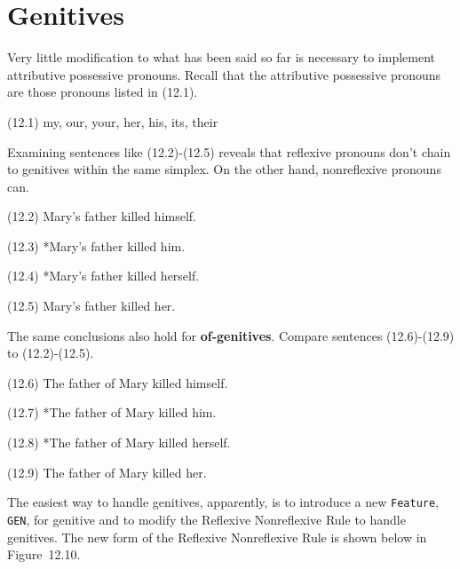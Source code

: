 \documentclass{article}
\begin{document}
%
%

\section{Genitives}

Very little modification to what has been said so far is
necessary to implement attributive possessive pronouns.  Recall
that the attributive possessive pronouns are those pronouns
listed in (12.1).

\begin{enumerate*}
\item[(12.1)] my, our, your, her, his, its, their
\end{enumerate*}

Examining sentences like (12.2)-(12.5) reveals that reflexive
pronouns don't chain to genitives within the same simplex. On
the other hand, nonreflexive pronouns can.

\begin{enumerate*}
\item[(12.2)] Mary's father killed himself.
\item[(12.3)] *Mary's father killed him.
\item[(12.4)] *Mary's father killed herself.
\item[(12.5)] Mary's father killed her.
\end{enumerate*}

The same conclusions also hold for \textbf{of-genitives}.
Compare sentences (12.6)-(12.9) to (12.2)-(12.5).

\begin{enumerate*}
\item[(12.6)] The father of Mary killed himself.
\item[(12.7)] *The father of Mary killed him.
\item[(12.8)] *The father of Mary killed herself.
\item[(12.9)] The father of Mary killed her.
\end{enumerate*}

The easiest way to handle genitives, apparently, is to introduce
a new \texttt{Feature}, \texttt{GEN}, for genitive and to modify
the Reflexive Nonreflexive Rule to handle genitives. The new
form of the Reflexive Nonreflexive Rule is shown below in
Figure~12.10.
\end{document}
